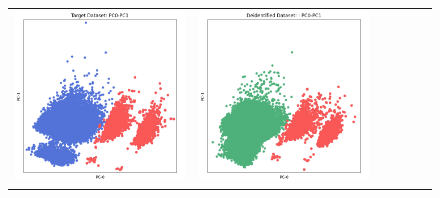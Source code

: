 \begin{figure}[p!]
\begin{tabular}{@{} M{0.166\textwidth} M{0.166\textwidth} | M{0.166\textwidth} M{0.166\textwidth} | M{0.166\textwidth} M{0.166\textwidth} @{}}
       \includegraphics[width=\linewidth]{z_sdx-single.orig.png} &
       \includegraphics[width=\linewidth]{z_sdx-single.syn.png} \\ 

\end{tabular}
\end{figure}

